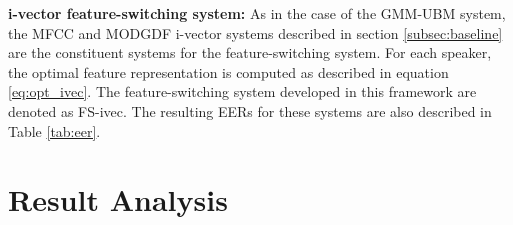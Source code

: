 \documentclass{article}
\begin{document}
\textbf{i-vector feature-switching system:}
As in the case of the GMM-UBM system, the MFCC and MODGDF i-vector systems
described in section \ref{subsec:baseline} are the constituent systems for the
feature-switching system. For each speaker, the optimal feature representation
is computed as described in equation \ref{eq:opt_ivec}.
The feature-switching system developed in this
framework are denoted as FS-ivec. 
The resulting EERs for 
these systems are also described in Table \ref{tab:eer}.

\section{Result Analysis}
\label{subsec:resAnalysis}
\end{document}
